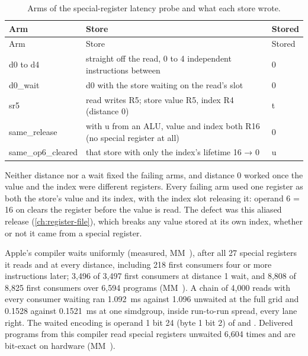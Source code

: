 \begin{xltabular}{\linewidth}{@{}>{\hsize}X>{\hsize}Xl@{}}
\caption{Arms of the special-register latency probe and what each store wrote.}\label{tab:sr-latency-arms}\\
\toprule
Arm & Store & Stored \\
\midrule
\endfirsthead
{}
\toprule
Arm & Store & Stored \\
\midrule
\endhead
d0 to d4 &  straight off the read, 0 to 4 independent instructions
between & 0 \\*
d0\_wait & d0 with the store waiting on the read's slot & 0 \\*
sr5 & read writes R5; store value R5, index R4 (distance 0) & t \\*
same\_release &  with u from an ALU, value and index both R16 (no special
register at all) & 0 \\*
same\_op6\_cleared & that store with only the index's lifetime 16
→ 0 & u \\*
\bottomrule
\end{xltabular}

Neither distance nor a wait fixed the failing arms, and distance 0 worked once the value and the index were different
registers. Every failing arm used one register as both the store's value and its index, with the index slot releasing it:
operand 6 = 16 on  clears the register before the value is read. The defect was this aliased release
(\cref{ch:register-file}), which breaks any value stored at its own index, whether or not it came from a special register.

Apple's compiler waits uniformly (measured, MM~), after all 27 special registers it reads and
at every distance, including 218 first consumers four or more instructions later; 3,496 of 3,497 first consumers at distance 1
wait, and 8,808 of 8,825 first consumers over 6,594 programs (MM~). A chain of 4,000 reads with
every consumer waiting ran 1.092~ms against 1.096 unwaited at the full grid and 0.1528 against 0.1521~ms at one simdgroup,
inside run-to-run spread, every lane right. The waited encoding is operand 1 bit 24 (byte 1 bit 2) of  and . Delivered programs from this compiler read special registers unwaited 6,604 times and are
bit-exact on hardware (MM~).


